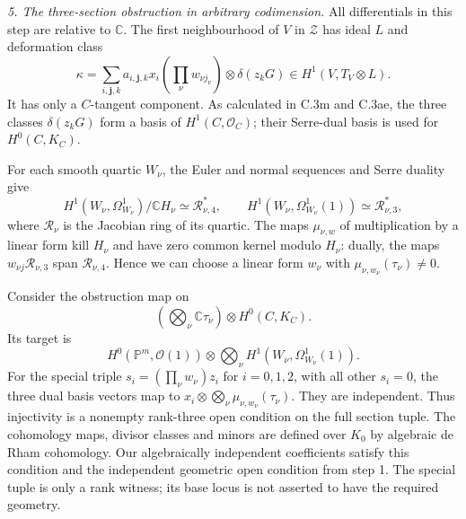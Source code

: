 \emph{5. The three-section obstruction in arbitrary codimension.}
All differentials in this step are relative to $\mathbb C$.
The first neighbourhood of $V$ in $\mathcal Z$ has ideal
$L$ and deformation class
\[
 \kappa=\sum_{i,\mathbf j,k}a_{i,\mathbf j,k}x_i
       \left(\prod_\nu w_{\nu j_\nu}\right)
                   \otimes\delta(z_kG)
       \in H^1(V,T_V\otimes L).
\]
It has only a $C$-tangent component. As calculated in
C.3m and C.3ae, the three classes $\delta(z_kG)$ form a
basis of $H^1(C,\mathcal O_C)$; their Serre-dual basis
is used for $H^0(C,K_C)$.

For each smooth quartic $W_\nu$, the Euler and normal
sequences and Serre duality give
\[
 H^1(W_\nu,\Omega^1_{W_\nu})/\mathbb C H_\nu
       \simeq\mathcal R_{\nu,4}^*,\qquad
 H^1(W_\nu,\Omega^1_{W_\nu}(1))
       \simeq\mathcal R_{\nu,3}^*,
\]
where $\mathcal R_\nu$ is the Jacobian ring of its quartic.
The maps $\mu_{\nu,w}$ of multiplication by a linear form
kill $H_\nu$ and have zero common kernel modulo $H_\nu$:
dually, the maps $w_{\nu j}\mathcal R_{\nu,3}$ span
$\mathcal R_{\nu,4}$. Hence we can choose a linear form
$w_\nu$ with $\mu_{\nu,w_\nu}(\tau_\nu)\ne0$.

Consider the obstruction map on
\[
 \left(\bigotimes_\nu\mathbb C\tau_\nu\right)
                       \otimes H^0(C,K_C).
\]
Its target is
\[
 H^0(\mathbb P^m,\mathcal O(1))\otimes
       \bigotimes_\nu H^1(W_\nu,\Omega^1_{W_\nu}(1)).
\]
For the special triple
$s_i=(\prod_\nu w_\nu)z_i$ for $i=0,1,2$, with all
other $s_i=0$, the three dual basis vectors map to
$x_i\otimes\bigotimes_\nu\mu_{\nu,w_\nu}(\tau_\nu)$.
They are independent. Thus injectivity is a nonempty
rank-three open condition on the full section tuple.
The cohomology maps, divisor classes and minors are
defined over $K_0$ by algebraic de Rham cohomology.
Our algebraically independent coefficients satisfy this
condition and the independent geometric open condition
from step 1. The special tuple is only a rank witness;
its base locus is not asserted to have the required geometry.

